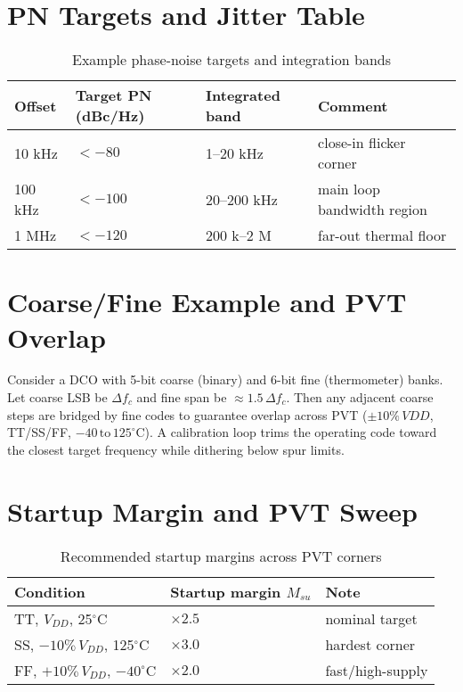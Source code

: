 \section{PN Targets and Jitter Table}
\begin{table}[H]
  \centering
  \begin{tabular}{llll}
    \toprule
    Offset & Target PN (dBc/Hz) & Integrated band & Comment \\
    \midrule
    10 kHz  & $<-80$  & 1–20 kHz  & close-in flicker corner \\
    100 kHz & $<-100$ & 20–200 kHz & main loop bandwidth region \\
    1 MHz   & $<-120$ & 200 k–2 M & far-out thermal floor \\
    \bottomrule
  \end{tabular}
  \caption{Example phase-noise targets and integration bands}
\end{table}

\section{Coarse/Fine Example and PVT Overlap}
Consider a DCO with 5-bit coarse (binary) and 6-bit fine (thermometer) banks. Let coarse LSB be \(\Delta f_c\) and fine span be \(\approx 1.5\,\Delta f_c\). Then any adjacent coarse steps are bridged by fine codes to guarantee overlap across PVT (\(\pm10\%\,VDD\), TT/SS/FF, \(-40\,\text{to}\,125^\circ\!\text{C}\)). A calibration loop trims the operating code toward the closest target frequency while dithering below spur limits.

\section{Startup Margin and PVT Sweep}
\begin{table}[H]
  \centering
  \begin{tabular}{lll}
    \toprule
    Condition & Startup margin $M_{su}$ & Note \\
    \midrule
    TT, $V_{DD}$, 25$^\circ$C & $\times 2.5$ & nominal target \\
    SS, $-10\%\,V_{DD}$, 125$^\circ$C & $\times 3.0$ & hardest corner \\
    FF, $+10\%\,V_{DD}$, $-40^\circ$C & $\times 2.0$ & fast/high-supply \\
    \bottomrule
  \end{tabular}
  \caption{Recommended startup margins across PVT corners}
\end{table}

